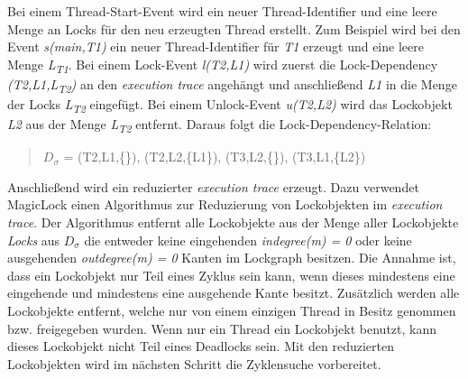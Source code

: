 Bei einem Thread-Start-Event wird ein neuer Thread-Identifier und eine leere
Menge an Locks für den neu erzeugten Thread erstellt. Zum Beispiel wird bei den
Event \emph{s(main,T1)} ein neuer Thread-Identifier für \emph{T1} erzeugt und
eine leere Menge \emph{L\textsubscript{T1}}. Bei einem Lock-Event
\emph{l(T2,L1)} wird zuerst die Lock-Dependency
\emph{(T2,L1,L\textsubscript{T2})} an den \emph{execution trace} angehängt und
anschließend \emph{L1} in die Menge der Locks \emph{L\textsubscript{T2}}
eingefügt. Bei einem Unlock-Event \emph{u(T2,L2)} wird das Lockobjekt \emph{L2}
aus der Menge \emph{L\textsubscript{T2}} entfernt. Daraus folgt die
Lock-Dependency-Relation:
\begin{quote}
  \textbf{$D_\sigma$} = (T2,L1,\{\}), (T2,L2,\{L1\}), (T3,L2,\{\}),
  (T3,L1,\{L2\})
\end{quote}
Anschließend wird ein reduzierter \emph{execution trace} erzeugt. Dazu verwendet
MagicLock einen Algorithmus zur Reduzierung von Lockobjekten im \emph{execution
trace}. Der Algorithmus entfernt alle Lockobjekte aus der Menge aller
Lockobjekte \emph{Locks} aus \emph{$D_\sigma$} die entweder keine eingehenden
\emph{indegree(m) = 0} oder keine ausgehenden \emph{outdegree(m) = 0} Kanten im
Lockgraph besitzen. Die Annahme ist, dass ein Lockobjekt nur Teil eines Zyklus
sein kann, wenn dieses mindestens eine eingehende und mindestens eine ausgehende
Kante besitzt. Zusätzlich werden alle Lockobjekte entfernt, welche nur von einem
einzigen Thread in Besitz genommen bzw. freigegeben wurden. Wenn nur ein Thread
ein Lockobjekt benutzt, kann dieses Lockobjekt nicht Teil eines Deadlocks sein.
Mit den reduzierten Lockobjekten wird im nächsten Schritt die Zyklensuche
vorbereitet.

